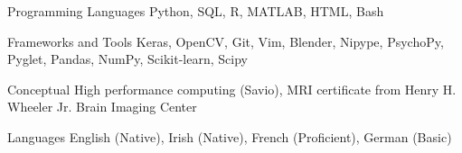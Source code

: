 

\begin{cvskills}

 \cvskill
  	{Programming Languages}
    {Python, SQL, R, MATLAB, HTML, Bash} %
  
 \cvskill
   {Frameworks and Tools}
   {Keras, OpenCV, Git, Vim, Blender, Nipype, PsychoPy, Pyglet, Pandas, NumPy, Scikit-learn, Scipy}
   
 \cvskill
   {Conceptual}
   {High performance computing (Savio), MRI certificate from Henry H. Wheeler Jr. Brain Imaging Center}
   
  \cvskill
   {Languages}
   {English (Native), Irish (Native), French (Proficient), German (Basic)}
    

\end{cvskills}
